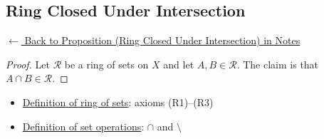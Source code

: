 
\subsection*{Ring Closed Under Intersection}
\label{prf:ring-closed-intersection}

\begin{remark*}[Return]
\hyperref[prop:ring-closed-intersection]{$\leftarrow$ Back to Proposition (Ring Closed Under Intersection) in Notes}
\end{remark*}

\begin{proof}
Let $\mathcal{R}$ be a ring of sets on $X$ and let $A, B \in \mathcal{R}$.
The claim is that $A \cap B \in \mathcal{R}$.

\end{proof}

\begin{remark*}

\end{remark*}

\begin{remark*}[Dependencies]
\begin{itemize}
  \item \hyperref[def:ring-of-sets]{Definition of ring of sets}: axioms (R1)--(R3)
  \item \hyperref[def:set-operations]{Definition of set operations}: $\cap$ and $\setminus$
\end{itemize}

\end{remark*}
